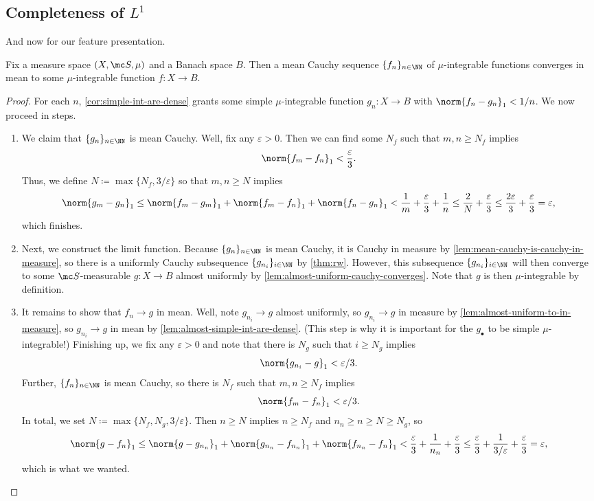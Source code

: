 \documentclass[../notes.tex]{subfiles}
\begin{document}
\subsection{Completeness of \texorpdfstring{$L^1$}{ L1}}
And now for our feature presentation.
\begin{proposition} \label{prop:l1-complete}
	Fix a measure space $(X,\mc S,\mu)$ and a Banach space $B$. Then a mean Cauchy sequence $\{f_n\}_{n\in\NN}$ of $\mu$-integrable functions converges in mean to some $\mu$-integrable function $f\colon X\to B$.
\end{proposition}
\begin{proof}
	For each $n$, \autoref{cor:simple-int-are-dense} grants some simple $\mu$-integrable function $g_n\colon X\to B$ with $\norm{f_n-g_n}_1<1/n$. We now proceed in steps.
	\begin{enumerate}
		\item We claim that $\{g_n\}_{n\in\NN}$ is mean Cauchy. Well, fix any $\varepsilon>0$. Then we can find some $N_f$ such that $m,n\ge N_f$ implies
		\[\norm{f_m-f_n}_1<\frac\varepsilon3.\]
		Thus, we define $N\coloneqq\max\{N_f,3/\varepsilon\}$ so that $m,n\ge N$ implies
		\[\norm{g_m-g_n}_1\le\norm{f_m-g_m}_1+\norm{f_m-f_n}_1+\norm{f_n-g_n}_1<\frac1m+\frac\varepsilon3+\frac1n\le\frac2N+\frac\varepsilon3\le\frac{2\varepsilon}3+\frac\varepsilon3=\varepsilon,\]
		which finishes.
		\item Next, we construct the limit function. Because $\{g_n\}_{n\in\NN}$ is mean Cauchy, it is Cauchy in measure by \autoref{lem:mean-cauchy-is-cauchy-in-measure}, so there is a uniformly Cauchy subsequence $\{g_{n_i}\}_{i\in\NN}$ by \autoref{thm:rw}. However, this subsequence $\{g_{n_i}\}_{i\in\NN}$ will then converge to some $\mc S$-measurable $g\colon X\to B$ almost uniformly by \autoref{lem:almost-uniform-cauchy-converges}. Note that $g$ is then $\mu$-integrable by definition.
		\item It remains to show that $f_n\to g$ in mean. Well, note $g_{n_i}\to g$ almost uniformly, so $g_{n_i}\to g$ in measure by \autoref{lem:almost-uniform-to-in-measure}, so $g_{n_i}\to g$ in mean by \autoref{lem:almost-simple-int-are-dense}. (This step is why it is important for the $g_\bullet$ to be simple $\mu$-integrable!) Finishing up, we fix any $\varepsilon>0$ and note that there is $N_g$ such that $i\ge N_g$ implies
		\[\norm{g_{n_i}-g}_1<\varepsilon/3.\]
		Further, $\{f_n\}_{n\in\NN}$ is mean Cauchy, so there is $N_f$ such that $m,n\ge N_f$ implies
		\[\norm{f_m-f_n}_1<\varepsilon/3.\]
		In total, we set $N\coloneqq\max\{N_f,N_g,3/\varepsilon\}$. Then $n\ge N$ implies $n\ge N_f$ and $n_n\ge n\ge N\ge N_g$, so
		\[\norm{g-f_n}_1\le\norm{g-g_{n_n}}_1+\norm{g_{n_n}-f_{n_n}}_1+\norm{f_{n_n}-f_n}_1<\frac\varepsilon3+\frac1{n_n}+\frac\varepsilon3\le\frac\varepsilon3+\frac1{3/\varepsilon}+\frac\varepsilon3=\varepsilon,\]
		which is what we wanted.
		\qedhere
	\end{enumerate}
\end{proof}
\end{document}
